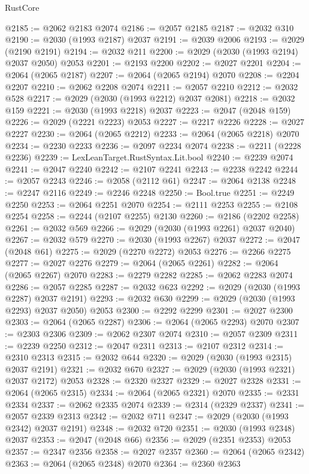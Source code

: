 \begin{lexlean}{RustCore}
\begin{coremodule}
@2185 := @2062 @2183 @2074
@2186 := @2057 @2185
@2187 := @2032 @310
@2190 := @2030 (@1993 @2187) @2037
@2191 := @2039 @2006
@2193 := @2029 (@2190 @2191)
@2194 := @2032 @211
@2200 := @2029 (@2030 (@1993 @2194) @2037 @2050) @2053
@2201 := @2193 @2200
@2202 := @2027 @2201
@2204 := @2064 (@2065 @2187)
@2207 := @2064 (@2065 @2194) @2070
@2208 := @2204 @2207
@2210 := @2062 @2208 @2074
@2211 := @2057 @2210
@2212 := @2032 @528
@2217 := @2029 (@2030 (@1993 @2212) @2037 @2081)
@2218 := @2032 @159
@2221 := @2030 (@1993 @2218) @2037
@2223 := @2047 (@2048 @159)
@2226 := @2029 (@2221 @2223) @2053
@2227 := @2217 @2226
@2228 := @2027 @2227
@2230 := @2064 (@2065 @2212)
@2233 := @2064 (@2065 @2218) @2070
@2234 := @2230 @2233
@2236 := @2097 @2234 @2074
@2238 := @2211 (@2228 @2236)
@2239 := LexLeanTarget.RustSyntax.Lit.bool
@2240 := @2239 @2074
@2241 := @2047 @2240
@2242 := @2107 @2241
@2243 := @2238 @2242
@2244 := @2057 @2243
@2246 := @2058 (@2112 @61)
@2247 := @2064 @2138
@2248 := @2247 @2116
@2249 := @2246 @2248
@2250 := Bool.true
@2251 := @2249 @2250
@2253 := @2064 @2251 @2070
@2254 := @2111 @2253
@2255 := @2108 @2254
@2258 := @2244 (@2107 @2255) @2130
@2260 := @2186 (@2202 @2258)
@2261 := @2032 @569
@2266 := @2029 (@2030 (@1993 @2261) @2037 @2040)
@2267 := @2032 @579
@2270 := @2030 (@1993 @2267) @2037
@2272 := @2047 (@2048 @61)
@2275 := @2029 (@2270 @2272) @2053
@2276 := @2266 @2275
@2277 := @2027 @2276
@2279 := @2064 (@2065 @2261)
@2282 := @2064 (@2065 @2267) @2070
@2283 := @2279 @2282
@2285 := @2062 @2283 @2074
@2286 := @2057 @2285
@2287 := @2032 @623
@2292 := @2029 (@2030 (@1993 @2287) @2037 @2191)
@2293 := @2032 @630
@2299 := @2029 (@2030 (@1993 @2293) @2037 @2050) @2053
@2300 := @2292 @2299
@2301 := @2027 @2300
@2303 := @2064 (@2065 @2287)
@2306 := @2064 (@2065 @2293) @2070
@2307 := @2303 @2306
@2309 := @2062 @2307 @2074
@2310 := @2057 @2309
@2311 := @2239 @2250
@2312 := @2047 @2311
@2313 := @2107 @2312
@2314 := @2310 @2313
@2315 := @2032 @644
@2320 := @2029 (@2030 (@1993 @2315) @2037 @2191)
@2321 := @2032 @670
@2327 := @2029 (@2030 (@1993 @2321) @2037 @2172) @2053
@2328 := @2320 @2327
@2329 := @2027 @2328
@2331 := @2064 (@2065 @2315)
@2334 := @2064 (@2065 @2321) @2070
@2335 := @2331 @2334
@2337 := @2062 @2335 @2074
@2339 := @2314 (@2329 @2337)
@2341 := @2057 @2339 @2313
@2342 := @2032 @711
@2347 := @2029 (@2030 (@1993 @2342) @2037 @2191)
@2348 := @2032 @720
@2351 := @2030 (@1993 @2348) @2037
@2353 := @2047 (@2048 @66)
@2356 := @2029 (@2351 @2353) @2053
@2357 := @2347 @2356
@2358 := @2027 @2357
@2360 := @2064 (@2065 @2342)
@2363 := @2064 (@2065 @2348) @2070
@2364 := @2360 @2363

\end{coremodule}
\end{lexlean}
